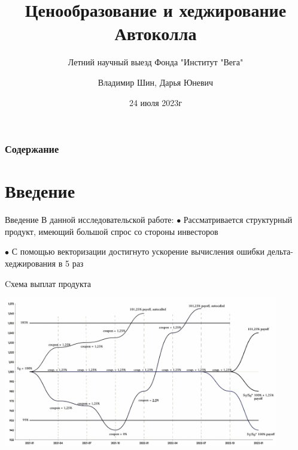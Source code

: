 \documentclass[aspectratio=169]{beamer}
\title{Ценообразование и хеджирование
Автоколла}
\subtitle{Летний научный выезд Фонда "Институт "Вега"}
\author{Владимир Шин, Дарья Юневич}
\institute{Vega Institute Foundation}
\date{24 июля 2023г}
\begin{document}
    \maketitle
    
    \begin{frame}
    \frametitle{Содержание} 
    \tableofcontents 
    \end{frame}


\section{Введение}
    \begin{frame}{Введение}
    В данной исследовательской работе:
    \newline
    \newline
    $\bullet$ Рассматривается структурный продукт, имеющий большой спрос со стороны инвесторов 

    
    $\bullet$ С помощью векторизации достигнуто ускорение вычисления ошибки дельта-хеджирования в 5 раз
  
    \end{frame}

   

\begin{frame}{Cхема выплат продукта}
\begin{center}
\includegraphics[width=12cm]{autocall_scheme.PNG}
\end{center}
\label{payoff}
\end{frame}
\end{document}
